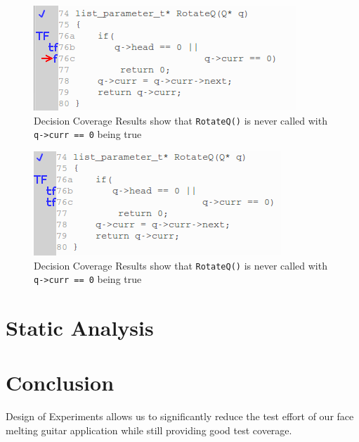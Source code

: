 \documentclass[12pt,journal]{article}
\begin{document}
\begin{figure}
    \centering
    \includegraphics[width=0.8\columnwidth]{missed_decision_coverage.png}
    \caption{Decision Coverage Results show that {\tt RotateQ()} is never called
    with {\tt q->curr == 0} being true}
    \label{fig:decision_coverage_before}
\end{figure}

\begin{figure}
    \centering
    \includegraphics[width=0.8\columnwidth]{improved_decision_coverage.png}
    \caption{Decision Coverage Results show that {\tt RotateQ()} is never called
    with {\tt q->curr == 0} being true}
    \label{fig:improved_coverage}
\end{figure}


\section{Static Analysis}

\section{Conclusion}
Design of Experiments allows us to significantly reduce the test effort of our
face melting guitar application while still providing good test coverage.

\clearpage
\singlespace






\doublespace

\printbibliography
\end{document}

